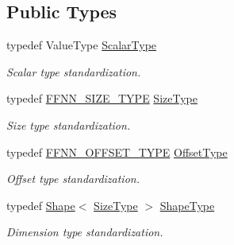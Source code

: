 \subsection*{Public Types}
\begin{DoxyCompactItemize}
\item 
typedef Value\-Type \hyperlink{classffnn_1_1layer_1_1internal_1_1_interface_a7f834e3365e5199bcbcd16d9abd63941}{Scalar\-Type}
\begin{DoxyCompactList}\small\item\em Scalar type standardization. \end{DoxyCompactList}\item 
typedef \hyperlink{global_8h_aab5a5a098c5bf31f4176f4a141d2ef65}{F\-F\-N\-N\-\_\-\-S\-I\-Z\-E\-\_\-\-T\-Y\-P\-E} \hyperlink{classffnn_1_1layer_1_1internal_1_1_interface_af0567642f60c65b5e87067226a54174b}{Size\-Type}
\begin{DoxyCompactList}\small\item\em Size type standardization. \end{DoxyCompactList}\item 
typedef \hyperlink{global_8h_af04b6e835b960cffc7ed05dfd1685ba0}{F\-F\-N\-N\-\_\-\-O\-F\-F\-S\-E\-T\-\_\-\-T\-Y\-P\-E} \hyperlink{classffnn_1_1layer_1_1internal_1_1_interface_adc5bb454329ebd51ac26579a43c006fd}{Offset\-Type}
\begin{DoxyCompactList}\small\item\em Offset type standardization. \end{DoxyCompactList}\item 
typedef \hyperlink{structffnn_1_1layer_1_1internal_1_1_shape}{Shape}$<$ \hyperlink{classffnn_1_1layer_1_1internal_1_1_interface_af0567642f60c65b5e87067226a54174b}{Size\-Type} $>$ \hyperlink{classffnn_1_1layer_1_1internal_1_1_interface_a945709b1d0ea54a51539b80d04485f5f}{Shape\-Type}
\begin{DoxyCompactList}\small\item\em Dimension type standardization. \end{DoxyCompactList}\end{DoxyCompactItemize}
